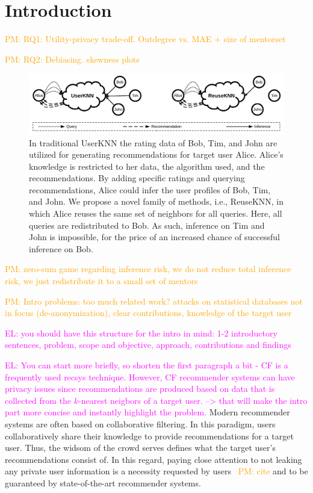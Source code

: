 \documentclass[manuscript,review,anonymous]{acmart}
\newcommand{\el}[1]{
        \textcolor{magenta}{EL: #1}}
\newcommand{\pmu}[1]{
        \textcolor{orange}{PM: #1}}
\begin{document}
\section{Introduction}
\pmu{RQ1: Utility-privacy trade-off. Outdegree vs. MAE + size of mentorset}
\pmu{RQ2: Debiasing. skewness plots}


\begin{figure}[!htb]
    \includegraphics[width=\textwidth]{figures/intro.pdf}
    \caption{In traditional UserKNN the rating data of Bob, Tim, and John are utilized for generating recommendations for target user Alice. Alice's knowledge is restricted to her data, the algorithm used, and the recommendations. By adding specific ratings and querying recommendations, Alice could infer the user profiles of Bob, Tim, and John.
    We propose a novel family of methods, i.e., ReuseKNN, in which Alice reuses the same set of neighbors for all queries. Here, all queries are redistributed to Bob. As such, inference on Tim and John is impossible, for the price of an increased chance of successful inference on Bob.}
\end{figure}

\pmu{zero-sum game regarding inference risk, we do not reduce total inference risk, we just redistribute it to a small set of mentors}

\pmu{Intro problems: too much related work? attacks on statistical databases not in focus (de-anonymization), clear contributions, knowledge of the target user}

\el{you should have this structure for the intro in mind: 1-2 introductory sentences, problem, scope and objective, approach, contributions and findings}

\el{You can start more briefly, so shorten the first paragraph a bit - CF is a frequently used recsys technique. However, CF recommender systems can have privacy issues since recommendations are produced based on data that is collected from the $k$-nearest neigbors of a target user. --> that will make the intro part more concise and instantly highlight the problem.}
Modern recommender systems are often based on collaborative filtering. 
In this paradigm, users collaboratively share their knowledge to provide recommendations for a target user. Thus, the widsom of the crowd serves defines what the target user's recommendations consist of.
In this regard, paying close attention to not leaking any private user information is a necessity requested by users~\pmu{cite} and to be guaranteed by state-of-the-art recommender systems.
\end{document}
